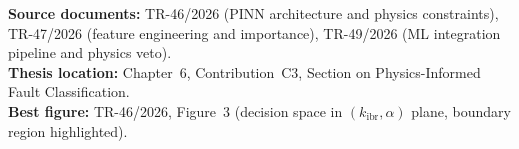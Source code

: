 \documentclass[12pt,a4paper]{article}
\begin{document}
\vfill
\begin{tcolorbox}[colback=iitmnavy!8,colframe=iitmnavy,arc=3pt,boxrule=0.8pt]
\small
\textbf{Source documents:} TR-46/2026 (PINN architecture and physics constraints), TR-47/2026 (feature engineering and importance), TR-49/2026 (ML integration pipeline and physics veto). \\
\textbf{Thesis location:} Chapter~6, Contribution~C3, Section on Physics-Informed Fault Classification. \\
\textbf{Best figure:} TR-46/2026, Figure~3 (decision space in $(k_\mathrm{ibr}, \alpha)$ plane, boundary region highlighted).
\end{tcolorbox}
\end{document}

